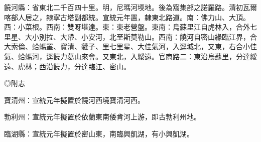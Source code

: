 \begin{pinyinscope}
饒河縣：省東北二千百四十里。明，尼瑪河堧地。後為窩集部之諾羅路。清初瓦爾喀部人居之，隸寧古塔副都統。宣統元年置，隸東北路道。南：佛力山、大頂。西：小菜根。西南：雙呀堪達。東：東老營盤。東南：烏蘇里江自虎林入，合外七里星、大小別拉、大帶、小安河，北至斯莫勒山。西南：饒河自密山緣臨江界，合大索倫、蛤螞罣、寶清、貛子、里七里星、大佳氣河，入逕城北，又東，右合小佳氣、蛤螞河，逕饒力葛山來會。又東北，入綏遠。官商路二：東沿烏蘇里，分達綏遠、虎林；西沿饒力，分達臨江、密山。

◎附志

寶清州：宣統元年擬置於饒河西境寶清河西。

勃利州：宣統元年擬置於依蘭東南倭肯河上游，即古勃利州地。

臨湖縣：宣統元年擬置於密山東，南臨興凱湖，有小興凱湖。


\end{pinyinscope}